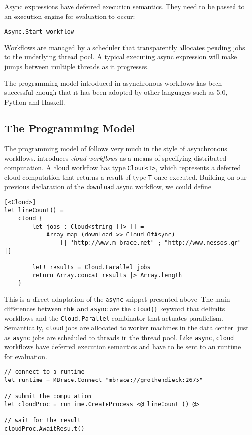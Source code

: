 Async expressions have deferred execution semantics. They need to be passed to an
execution engine for evaluation to occur:
\begin{lstlisting} 
Async.Start workflow
\end{lstlisting}
Workflows are managed by a scheduler that transparently allocates pending jobs to the 
underlying \dotnet{} thread pool. A typical executing async expression will make jumps 
between multiple threads as it progresses.

The programming model introduced in \fsharp{} asynchronous workflows has been successful
enough that it has been adopted by other languages such as \csharp{} 5.0, Python and Haskell.

\subsection{The \TitularMbrace{} Programming Model}

The programming model of \mbrace{} follows very much in the style of \fsharp{} 
asynchronous workflows. \Mbrace{} introduces \emph{cloud workflows}
as a means of specifying distributed computation.
A cloud workflow has type \texttt{Cloud<\uq{}T>}, which represents a
deferred cloud computation that returns a result of type \texttt{\uq{}T} once executed.
Building on our previous declaration of the \texttt{download} async workflow, we could define
\begin{lstlisting}
[<Cloud>]
let lineCount() = 
	cloud {
    	let jobs : Cloud<string []> [] = 
        	Array.map (download >> Cloud.OfAsync) 
				[| "http://www.m-brace.net" ; "http://www.nessos.gr" |]

	    let! results = Cloud.Parallel jobs
    	return Array.concat results |> Array.length
	}
\end{lstlisting}
This is a direct adaptation of the \texttt{async} snippet presented above.
The main differences between this and \texttt{async} 
are the \texttt{cloud\{\}} keyword that delimits workflows
and the \texttt{Cloud.Parallel} combinator that actuates parallelism.
Semantically, \texttt{cloud} jobs are allocated to worker machines in the data center, 
just as \texttt{async} jobs are scheduled to threads in the thread pool. 
Like \texttt{async}, \texttt{cloud} workflows have deferred execution semantics 
and have to be sent to an \mbrace{} runtime for evaluation.
\begin{lstlisting}
// connect to a runtime
let runtime = MBrace.Connect "mbrace://grothendieck:2675"

// submit the computation
let cloudProc = runtime.CreateProcess <@ lineCount () @>

// wait for the result
cloudProc.AwaitResult()
\end{lstlisting}
%
